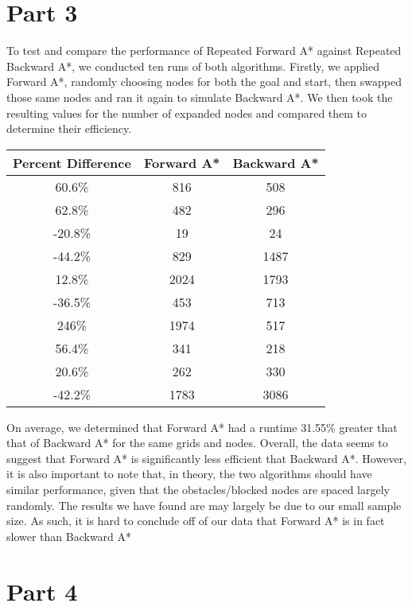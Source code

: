 \documentclass{article}
\begin{document}
\section{Part 3}
To test and compare the performance of Repeated Forward A* against Repeated Backward A*, we conducted ten runs of both algorithms. Firstly, we applied Forward A*, randomly choosing nodes for both the goal and start, then swapped those same nodes and ran it again to simulate Backward A*. We then took the resulting values for the number of expanded nodes and compared them to determine their efficiency.
\begin{center}
	\begin{tabular}{|c|c|c|}
		\hline
		Percent Difference & Forward A* & Backward A* \\
		\hline
		60.6\% & 816 & 508 \\
		62.8\% & 482 & 296 \\
		-20.8\% & 19 & 24 \\
		-44.2\% & 829 & 1487 \\
		12.8\% & 2024 & 1793 \\
		-36.5\% & 453 & 713 \\
		246\% & 1974 & 517 \\
		56.4\% & 341 & 218 \\
		20.6\% & 262 & 330 \\
		-42.2\% & 1783 & 3086 \\
		\hline
	\end{tabular}
\end{center}

On average, we determined that Forward A* had a runtime 31.55\% greater that that of Backward A* for the same grids and nodes. Overall, the data seems to suggest that Forward A* is significantly less efficient that Backward A*. However, it is also important to note that, in theory, the two algorithms should have similar performance, given that the obstacles/blocked nodes are spaced largely randomly. The results we have found are may largely be due to our small sample size. As such, it is hard to conclude off of our data that Forward A* is in fact slower than Backward A*
\section{Part 4}
\end{document}
